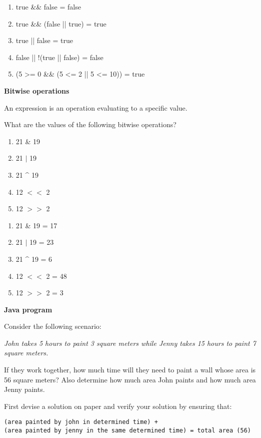 \begin{questions}
\begin{solution}
\begin{enumerate}
\item true \&\& false = false
\item true \&\& (false || true) = true
\item true || false = true
\item false || !(true || false) = false
\item (5 >= 0 \&\& (5 <= 2 || 5 <= 10)) = true
\end{enumerate}	 
\end{solution}


\question \textbf{Bitwise operations}
\vskip 0.5cm

An expression is an operation evaluating to a specific value.

What are the values of the following bitwise operations?

\begin{enumerate}
\item 21 \& 19
\item 21 $|$ 19
\item 21 \^{} 19
\item 12 $<<$ 2
\item 12 $>>$ 2
\end{enumerate}

\begin{solution}
\begin{enumerate}
\item 21 \& 19 = 17
\item 21 $|$ 19 = 23
\item 21 \^{} 19 = 6
\item 12 $<<$ 2 = 48
\item 12 $>>$ 2 = 3
\end{enumerate}	
\end{solution}

\question \textbf{Java program}
\vskip 0.5cm

Consider the following scenario:

\textit{John takes 5 hours to paint 3 square meters while Jenny takes 15 hours to paint 7 square meters.}

If they work together, how much time will they need to paint a wall whose area is 56 square meters? Also determine how much area John paints and how much area Jenny paints.

First devise a solution on paper and verify your solution by ensuring that:

\begin{verbatim}
(area painted by john in determined time) +
(area painted by jenny in the same determined time) = total area (56)
\end{verbatim}


\end{questions}
